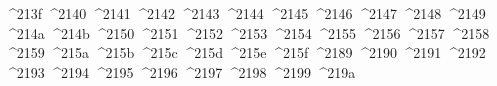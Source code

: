 {  ^^^^213f%
  ^^^^2140%
  ^^^^2141%
  ^^^^2142%
  ^^^^2143%
  ^^^^2144%
  ^^^^2145%
  ^^^^2146%
  ^^^^2147%
  ^^^^2148%
  ^^^^2149%
  ^^^^214a%
  ^^^^214b%
  ^^^^2150%
  ^^^^2151%
  ^^^^2152%
  ^^^^2153%
  ^^^^2154%
  ^^^^2155%
  ^^^^2156%
  ^^^^2157%
  ^^^^2158%
  ^^^^2159%
  ^^^^215a%
  ^^^^215b%
  ^^^^215c%
  ^^^^215d%
  ^^^^215e%
  ^^^^215f%
  ^^^^2189%
  ^^^^2190%
  ^^^^2191%
  ^^^^2192%
  ^^^^2193%
  ^^^^2194%
  ^^^^2195%
  ^^^^2196%
  ^^^^2197%
  ^^^^2198%
  ^^^^2199%
  ^^^^219a%
}
